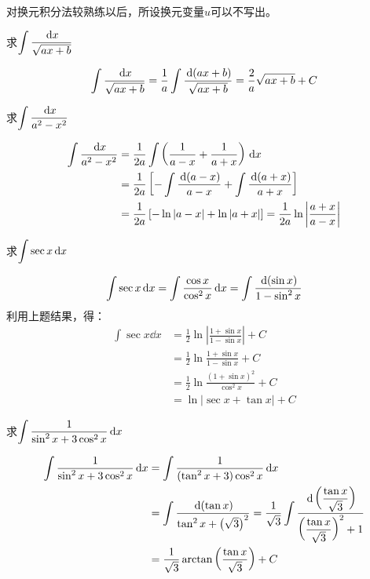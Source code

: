对换元积分法较熟练以后，所设换元变量$u$可以不写出。

\begin{example}
求$\displaystyle\int \dfrac{\,{\rm d} x}{\sqrt{ax+b}}$
\end{example}

\begin{solution}
    \[\displaystyle\int \dfrac{\,{\rm d} x}{\sqrt{ax+b}}=\dfrac{1}{a}\int \dfrac{\,{\rm d}(ax+b)}{\sqrt{ax+b}}=\dfrac{2}{a}\sqrt{ax+b}+C\]
\end{solution}

\begin{example}
    求$\displaystyle\int \dfrac{\,{\rm d} x}{a^2-x^2}$
\end{example}

\begin{solution}
\[\begin{split}
    \displaystyle\int \dfrac{\,{\rm d} x}{a^2-x^2}&=\dfrac{1}{2a}\int\left(\dfrac{1}{a-x}+\dfrac{1}{a+x}\right)\,{\rm d} x\\
    &=\dfrac{1}{2a}\left[-\int\dfrac{\,{\rm d}(a-x)}{a-x}+\int\dfrac{\,{\rm d}(a+x)}{a+x}\right]\\
    &=\dfrac{1}{2a}\left[-\ln|a-x|+\ln|a+x|\right]=\dfrac{1}{2a}\ln\left|\dfrac{a+x}{a-x}\right|
\end{split}\]
\end{solution}

\begin{example}
    求$\displaystyle\int \sec x\,{\rm d} x$
\end{example}

\begin{solution}
    \[\displaystyle\int \sec x\,{\rm d} x=\int \dfrac{\cos x}{\cos^2 x}\,{\rm d} x=\int \dfrac{\,{\rm d}(\sin x)}{1-\sin^2 x}\]
利用上题结果，得：
\[\begin{split}
    \int \sec x\dd x&=\frac{1}{2}\ln\left|\frac{1+\sin x}{1-\sin x}\right|+C\\
    &=\frac{1}{2}\ln\frac{1+\sin x}{1-\sin x}+C\\
    &=\frac{1}{2}\ln\frac{(1+\sin x)^2}{\cos^2 x}+C\\
    &=\ln|\sec x+\tan x|+C
\end{split}\]

\end{solution}

\begin{example}
    求$\displaystyle\int \dfrac{1}{\sin^2x +3\cos^2x}\,{\rm d} x$
\end{example}

\begin{solution}
    \[\begin{split}
        \displaystyle\int \dfrac{1}{\sin^2x +3\cos^2x}\,{\rm d} x&=\displaystyle\int \dfrac{1}{(\tan^2x +3)\cos^2x}\,{\rm d} x\\
        &=\int \dfrac{\,{\rm d} (\tan x)}{\tan^2 x+\left(\sqrt{3}\right)^2}=\dfrac{1}{\sqrt{3}}\int \dfrac{\,{\rm d}\left(\dfrac{\tan x}{\sqrt{3}}\right)}{\left(\dfrac{\tan x}{\sqrt{3}}\right)^2+1}\\
        &=\dfrac{1}{\sqrt{3}}\arctan\left(\dfrac{\tan x}{\sqrt{3}}\right)+C      
    \end{split}\]
\end{solution}

